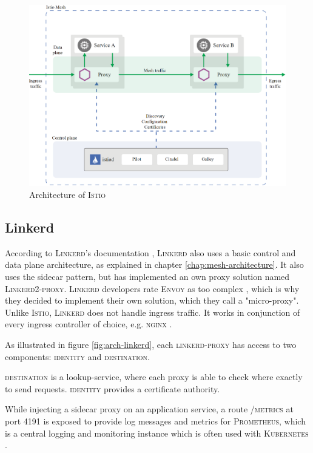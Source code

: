 \begin{figure}
    \includegraphics[width=\columnwidth]{img/istio_architecture.png}
    \caption{Architecture of \textsc{Istio} \cite{istio-docs-arch}}
    \label{fig:arch-istio}
\end{figure}

\subsection{Linkerd}
\label{linkerd}
According to \textsc{Linkerd}'s documentation \cite{linkerd-docs-arch}, \textsc{Linkerd} also uses a basic control and data plane architecture, as explained in chapter \ref{chap:mesh-architecture}. It also uses the sidecar pattern, but has implemented an own proxy solution named \textsc{Linkerd2-proxy}. \textsc{Linkerd} developers rate \textsc{Envoy} as too complex \cite{linkerd-docs-no-envoy}, which is why they decided to implement their own solution, which they call a "micro-proxy". 
Unlike \textsc{Istio}, \textsc{Linkerd} does not handle ingress traffic. It works in conjunction of every ingress controller of choice, e.g. \textsc{nginx} \cite{linkerd-docs-faq}.

As illustrated in figure \ref{fig:arch-linkerd}, each \textsc{linkerd-proxy} has access to two components: \textsc{identity} and \textsc{destination}.

\textsc{destination} is a lookup-service, where each proxy is able to check where exactly to send requests. \textsc{identity} provides a certificate authority.

While injecting a sidecar proxy on an application service, a route \textsc{/metrics} at port 4191 is exposed to provide log messages and metrics for \textsc{Prometheus}, which is a central logging and monitoring instance which is often used with \textsc{Kubernetes} \cite{linkerd-docs-arch}.

